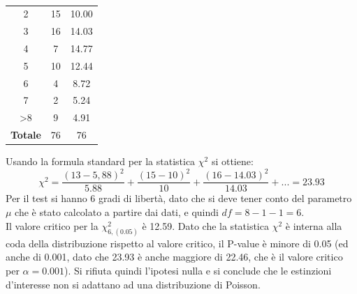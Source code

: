 \documentclass[10pt, draft]{book}
\newcounter{example}[section]
\begin{document}
\begin{example}
\begin{table}[H]
\begin{tabular}{c|c|c}
        2 & 15 & 10.00\\
        3 & 16 & 14.03\\
        4 & 7 & 14.77\\
        5 & 10 & 12.44\\
        6 & 4 & 8.72\\
        7 & 2 & 5.24 \\
        >8 & 9&4.91 \\
        \hline
        \textbf{Totale} & 76 & 76\\
        \hline
        \end{tabular}
        \caption{}
        \label{tabestinzioni2}
\end{table}\noindent
Usando la formula standard per la statistica $\chi^2$ si ottiene:
\begin{equation}
\chi^2 = \frac{(13-5,88)^2}{5.88}+\frac{(15-10)^2}{10}+\frac{(16-14.03)^2}{14.03}+... = 23.93
\end{equation}
Per il test si hanno 6 gradi di libertà, dato che si deve tener conto del parametro $\mu$ che è stato calcolato a partire dai dati, e quindi $df = 8-1-1=6$.
\\
Il valore critico per la $\chi^2_{6,(0.05)}$ è 12.59. Dato che la statistica $\chi^2$ è interna alla coda della distribuzione rispetto al valore critico, il P-value è minore di 0.05 (ed anche di 0.001, dato che 23.93 è anche maggiore di 22.46, che è il valore critico per $\alpha = 0.001$). Si rifiuta quindi l'ipotesi nulla e si conclude che le estinzioni d'interesse non si adattano ad una distribuzione di Poisson.
\end{example}

\end{document}

